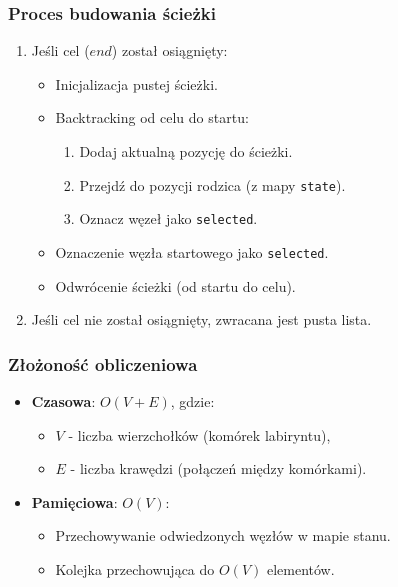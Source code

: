 \documentclass[../../../../doc.tex]{subfiles}
\begin{document}
\subsubsection{Proces budowania ścieżki}
\begin{enumerate}
  \item Jeśli cel ($end$) został osiągnięty:
        \begin{itemize}
          \item Inicjalizacja pustej ścieżki.
          \item Backtracking od celu do startu:
                \begin{enumerate}
                  \item Dodaj aktualną pozycję do ścieżki.
                  \item Przejdź do pozycji rodzica (z mapy \texttt{state}).
                  \item Oznacz węzeł jako \texttt{selected}.
                \end{enumerate}
          \item Oznaczenie węzła startowego jako \texttt{selected}.
          \item Odwrócenie ścieżki (od startu do celu).
        \end{itemize}
  \item Jeśli cel nie został osiągnięty, zwracana jest pusta lista.
\end{enumerate}


\subsubsection{Złożoność obliczeniowa}
\begin{itemize}
  \item \textbf{Czasowa}: $O(V + E)$, gdzie:
        \begin{itemize}
          \item $V$ - liczba wierzchołków (komórek labiryntu),
          \item $E$ - liczba krawędzi (połączeń między komórkami).
        \end{itemize}
  \item \textbf{Pamięciowa}: $O(V)$:
        \begin{itemize}
          \item Przechowywanie odwiedzonych węzłów w mapie stanu.
          \item Kolejka przechowująca do $O(V)$ elementów.
        \end{itemize}
\end{itemize}
\end{document}
